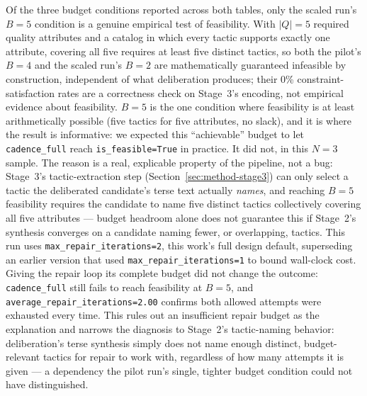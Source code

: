 \documentclass[lettersize,journal]{IEEEtran}
\begin{document}
Of the three budget conditions reported across both tables, only the scaled run's $B=5$ condition is a genuine empirical test of feasibility. With $|Q|=5$ required quality attributes and a catalog in which every tactic supports exactly one attribute, covering all five requires at least five distinct tactics, so both the pilot's $B=4$ and the scaled run's $B=2$ are mathematically guaranteed infeasible by construction, independent of what deliberation produces; their 0\% constraint-satisfaction rates are a correctness check on Stage~3's encoding, not empirical evidence about feasibility. $B=5$ is the one condition where feasibility is at least arithmetically possible (five tactics for five attributes, no slack), and it is where the result is informative: we expected this ``achievable'' budget to let \texttt{cadence\_full} reach \texttt{is\_feasible=True} in practice. It did not, in this $N=3$ sample. The reason is a real, explicable property of the pipeline, not a bug: Stage~3's tactic-extraction step (Section~\ref{sec:method-stage3}) can only select a tactic the deliberated candidate's terse text actually \emph{names}, and reaching $B=5$ feasibility requires the candidate to name five distinct tactics collectively covering all five attributes --- budget headroom alone does not guarantee this if Stage~2's synthesis converges on a candidate naming fewer, or overlapping, tactics. This run uses \texttt{max\_repair\_iterations=2}, this work's full design default, superseding an earlier version that used \texttt{max\_repair\_iterations=1} to bound wall-clock cost. Giving the repair loop its complete budget did not change the outcome: \texttt{cadence\_full} still fails to reach feasibility at $B=5$, and \texttt{average\_repair\_iterations=2.00} confirms both allowed attempts were exhausted every time. This rules out an insufficient repair budget as the explanation and narrows the diagnosis to Stage~2's tactic-naming behavior: deliberation's terse synthesis simply does not name enough distinct, budget-relevant tactics for repair to work with, regardless of how many attempts it is given --- a dependency the pilot run's single, tighter budget condition could not have distinguished.
\end{document}
